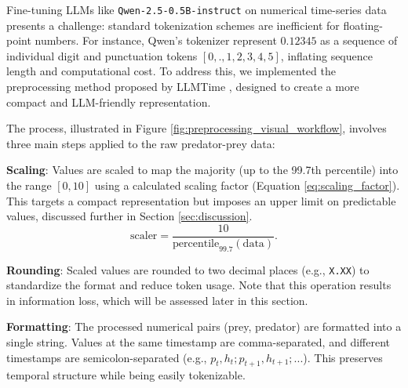 \documentclass{article}
\begin{document}
Fine-tuning LLMs like \texttt{Qwen-2.5-0.5B-instruct} on numerical time-series data presents a challenge: standard tokenization schemes are inefficient for floating-point numbers. For instance, Qwen's tokenizer represent $0.12345$ as a sequence of individual digit and punctuation tokens $[0, ., 1, 2, 3, 4, 5]$, inflating sequence length and computational cost. To address this, we implemented the preprocessing method proposed by LLMTime \cite{gruver2024largelanguagemodelszeroshot}, designed to create a more compact and LLM-friendly representation.

The process, illustrated in Figure \ref{fig:preprocessing_visual_workflow}, involves three main steps applied to the raw predator-prey data:
\begin{zenumerate}
    \item \textbf{Scaling}: Values are scaled to map the majority (up to the 99.7th percentile) into the range $[0, 10]$ using a calculated scaling factor (Equation \ref{eq:scaling_factor}). This targets a compact representation but imposes an upper limit on predictable values, discussed further in Section \ref{sec:discussion}.
    \begin{equation}
        \text{scaler} = \frac{10}{\text{percentile}_{99.7}(\text{data})}.
        \label{eq:scaling_factor}
    \end{equation}
    \item \textbf{Rounding}: Scaled values are rounded to two decimal places (e.g., \texttt{X.XX}) to standardize the format and reduce token usage. Note that this operation results in information loss, which will be assessed later in this section.
    \item \textbf{Formatting}: The processed numerical pairs (prey, predator) are formatted into a single string. Values at the same timestamp are comma-separated, and different timestamps are semicolon-separated (e.g., $p_t, h_t ; p_{t+1}, h_{t+1} ; ...$). This preserves temporal structure while being easily tokenizable.
\end{zenumerate}
\end{document}
